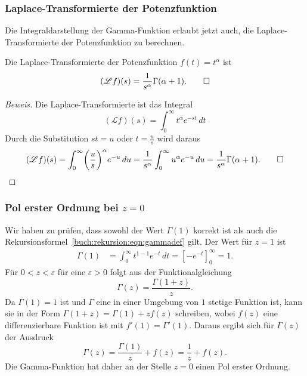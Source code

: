 \subsubsection{Laplace-Transformierte der Potenzfunktion}
Die Integraldarstellung der Gamma-Funktion erlaubt jetzt auch, die
Laplace-Transformierte der Potenzfunktion zu berechnen.
%

\begin{satz}
%
Die Laplace-Transformierte der Potenzfunktion $f(t)=t^\alpha$ ist
\[
(\mathscr{L}f)(s)
=
\frac{1}{s^\alpha} \Gamma(\alpha+1).
\qedhere
\]
\end{satz}

\begin{proof}[Beweis]
Die Laplace-Transformierte ist das Integral
\[
(\mathscr{L}f)(s)
=
\int_0^\infty t^\alpha e^{-st}\,dt
\]
Durch die Substitution $st = u$ oder $t=\frac{u}{s}$ wird daraus
\[
(\mathscr{L}f)(s)
=
\int_0^\infty \biggl(\frac{u}{s}\biggr)^\alpha e^{-u}\,du
=
\frac{1}{s^\alpha}\int_0^\infty u^{\alpha} e^{-u}\,du
=
\frac{1}{s^\alpha} \Gamma(\alpha+1).
\qedhere
\]
\end{proof}

%
%
\subsubsection{Pol erster Ordnung bei $z=0$}
%
Wir haben zu prüfen, dass sowohl der Wert $\Gamma(1)$ korrekt ist als
auch die Rekursionsformel~\eqref{buch:rekursion:eqn:gammadef} gilt.
Der Wert für $z=1$ ist
\begin{align*}
\Gamma(1)
&=
\int_0^\infty t^{1-1}e^{-t}\,dt
=
\left[ -e^{-t} \right]_0^\infty
=
1.
\end{align*}
%
Für $0<z<\varepsilon$ für eine $\varepsilon >0$ folgt aus der 
Funktionalgleichung
\[
\Gamma(z) = \frac{\Gamma(1+z)}{z}.
\]
Da $\Gamma(1)=1$ ist und $\Gamma$ eine in einer
Umgebung von $1$ stetige Funktion ist, kann sie in der Form
\(
\Gamma(1+z)=\Gamma(1) + zf(z)
\)
schreiben, wobei  $f(z)$ eine differenzierbare Funktion ist mit
$f'(1)=\Gamma'(1)$.
Daraus ergibt sich für $\Gamma(z)$ der Ausdruck
\[
\Gamma(z) = \frac{\Gamma(1)}{z} + f(z) = \frac{1}{z} + f(z).
\]
Die Gamma-Funktion hat daher an der Stelle $z=0$ einen Pol erster Ordnung.

